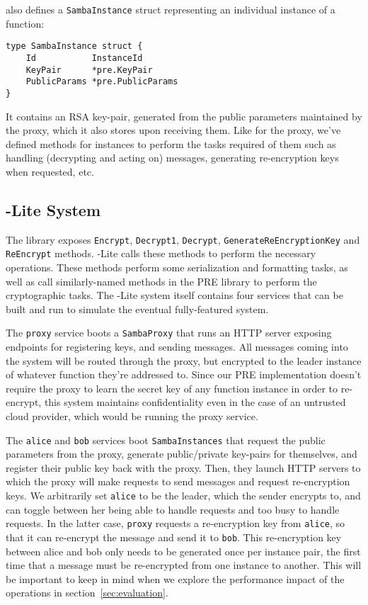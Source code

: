 \SystemName also defines a \texttt{SambaInstance} struct representing an individual instance of a function:

\begin{verbatim}
type SambaInstance struct {
	Id           InstanceId
	KeyPair      *pre.KeyPair
	PublicParams *pre.PublicParams
}
\end{verbatim}

It contains an RSA key-pair, generated from the public parameters maintained by the proxy, which it also stores upon receiving them.
%
Like for the proxy, we've defined methods for instances to perform the tasks required of them such as handling (decrypting and acting on) messages, generating re-encryption keys when requested, etc.


%
\subsection{\SystemName-Lite System}
The \SystemName library exposes \texttt{En\-crypt}, \texttt{De\-crypt1}, \texttt{Decrypt}, \texttt{Gen\-erate\-Re\-Encryption\-Key} and \texttt{ReEncrypt} methods.
\SystemName-Lite calls these methods to perform the necessary operations.
These methods perform some serialization and formatting tasks, as well as call similarly-named methods in the PRE library to perform the cryptographic tasks.
The \SystemName-Lite system itself contains four services that can be built and run to simulate the eventual fully-featured \SystemName system.

The \texttt{proxy} service boots a \texttt{SambaProxy} that runs an HTTP server exposing endpoints for registering keys, and sending messages. 
All messages coming into the system will be routed through the proxy, but encrypted to the leader instance of whatever function they're addressed to.
Since our PRE implementation doesn't require the proxy to learn the secret key of any function instance in order to re-encrypt, this system maintains confidentiality even in the case of an untrusted cloud provider, which would be running the proxy service.

The \texttt{alice} and \texttt{bob} services boot \texttt{SambaInstances} that request the public parameters from the proxy, generate public/private key-pairs for themselves, and register their public key back with the proxy. 
Then, they launch HTTP servers to which the proxy will make requests to send messages and request re-encryption keys.
We arbitrarily set \texttt{alice} to be the leader, which the sender encrypts to, and can toggle between her being able to handle requests and too busy to handle requests.
In the latter case, \texttt{proxy} requests a re-encryption key from \texttt{alice}, so that it can re-encrypt the message and send it to \texttt{bob}.
This re-encryption key between alice and bob only needs to be generated once per instance pair, the first time that a message must be re-encrypted from one instance to another.
This will be important to keep in mind when we explore the performance impact of the \SystemName operations in section~\ref{sec:evaluation}.

